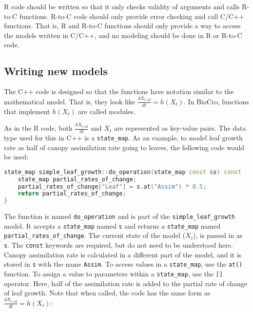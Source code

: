 \documentclass{article}
\newcommand{\code}[1]{\texttt{#1}}
\begin{document}
R code should be written so that it only checks validity of arguments and calls R-to-C functions. R-to-C code should only provide error checking and call C/C++ functions. That is, R and R-to-C functions should only provide a way to access the models written in C/C++, and no modeling should be done in R or R-to-C code.

\subsection{Writing new models}
The C++ code is designed so that the functions have notation similar to the mathematical model. That is, they look like $\frac{dX_{t,cd}}{dt} = h(X_{t})$. In BioCro, functions that implement $h(X_{t})$ are called modules.

As in the R code, both $\frac{dX_{t,cd}}{dt}$ and $X_{t}$ are represented as key-value pairs. The data type used for this in C++ is a \code{state\_map}. As an example, to model leaf growth rate as half of canopy assimilation rate going to leaves, the following code would be used:

\begin{minipage}{\linewidth}
\begin{center}
\begin{lstlisting}[language=c++]
state_map simple_leaf_growth::do_operation(state_map const &s) const
    state_map partial_rates_of_change;
    partial_rates_of_change["Leaf"] = s.at("Assim") * 0.5;
    return partial_rates_of_change;    
}
\end{lstlisting}
\end{center}
\end{minipage}

The function is named \code{do\_operation} and is part of the \code{simple\_leaf\_growth} model. It accepts a \code{state\_map} named \code{s} and returns a \code{state\_map} named \code{partial\_rates\_of\_change}. The current state of the model ($X_t$), is passed in as \code{s}. The \code{const} keywords are required, but do not need to be understood here. Canopy assimilation rate is calculated in a different part of the model, and it is stored in \code{s} with the name \code{Assim}. To access values in a \code{state\_map}, use the \code{at()} function. To assign a value to parameters within a \code{state\_map}, use the \code{[]} operator. Here, half of the assimilation rate is added to the partial rate of change of leaf growth. Note that when called, the code has the same form as $\frac{dX_{t,cd}}{dt} = h(X_{t})$:
\end{document}
